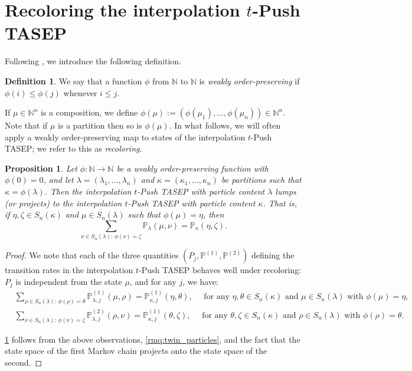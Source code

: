 \documentclass[12pt]{amsart}
\newtheorem{prop}[thm]{Proposition}
\theoremstyle{definition}
\newtheorem{definition}[thm]{Definition}
\newcommand{\NN}{\mathbb N}
\newcommand{\PP}{\mathbb P}
\newcommand{\PPone}[1]{\mathbb P^{(1)}_{#1}}
\newcommand{\PPtwo}[1]{\mathbb P^{(2)}_{#1}}
\begin{document}
\section{Recoloring the interpolation \texorpdfstring{$t$}{t}-Push TASEP}\label{sec:recoloring_Push_TASEP}
Following \cite{AyyerMartinWilliams2025}, we introduce the following definition.
\begin{definition}
    We say that a function $\phi$ from $\NN$ to $\NN$ is \emph{weakly order-preserving} if $\phi(i)\leq \phi(j)$ whenever $i\leq j$.
\end{definition}
If $\mu\in \NN^n$ is a composition, we define $\phi(\mu):=(\phi(\mu_1),\dots,\phi(\mu_n))\in \NN^n$.
Note that if $\mu$ is a partition then so is $\phi(\mu)$. In what follows, we will often apply a weakly order-preserving map to states of the interpolation $t$-Push TASEP; we refer to this as 
\emph{recoloring}.


\begin{prop}\label{prop:lumping}
    Let $\phi:\NN \to \NN$ be a weakly order-preserving function with $\phi(0)=0$, and let $\lambda=(\lambda_1,\dots,\lambda_n)$ and $\kappa=(\kappa_1,\dots,\kappa_n)$ be  partitions such that $\kappa=\phi(\lambda)$.
Then the interpolation $t$-Push TASEP with particle content $\lambda$ lumps (or projects) to the interpolation $t$-Push TASEP with particle content $\kappa$.  That is,  
    if $\eta,\zeta\in S_n(\kappa)$ and $\mu\in S_n(\lambda)$ such that $\phi(\mu)=\eta$, then
    $$\sum_{\nu\in S_n(\lambda):\, \phi(\nu)=\zeta}\PP_{\lambda}(\mu,\nu)=\PP_\kappa(\eta,\zeta).$$
\end{prop}

\begin{proof}
We note that each of the three quantities $(P_j,\PPone{},\PPtwo{})$ defining the transition rates in the interpolation $t$-Push TASEP behaves well under recoloring: $P_j$ is independent from the state $\mu$, and for any $j$, we have:
\begin{align*}
  &\sum_{\rho\in S_n(\lambda):\, \phi(\rho)=\theta}\PPone{\lambda,j}(\mu,\rho)
  =\PPone{\kappa,j}(\eta,\theta),\quad \text{ for any $\eta,\theta\in S_n(\kappa)$ and $\mu\in S_n(\lambda)$ with $\phi(\mu)=\eta$,}\\
    &\sum_{\nu\in S_n(\lambda):\, \phi(\nu)
    =\zeta}\PPtwo{\lambda,j}(\rho,\nu)=\PPone{\kappa,j}(\theta,\zeta),\quad \text{ for any $\theta,\zeta\in S_n(\kappa)$ and $\rho\in S_n(\lambda)$  with $\phi(\rho)=\theta$.}
\end{align*}

 
 \cref{prop:lumping} follows from the above observations, \cref{rmq:twin_particles}, and the fact that the 
 state space of the first Markov chain projects onto the state space of the second.
\end{proof}
\end{document}
